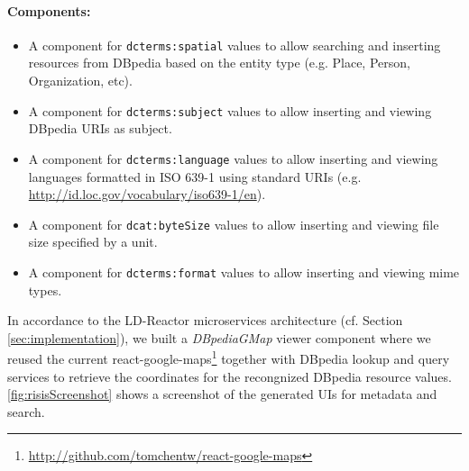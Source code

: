\documentclass{acm_proc_article-sp}
\begin{document}
\paragraph{Components:}
\begin{itemize}
 \item A component for \texttt{dcterms:spatial} values to allow searching and inserting resources from DBpedia based on the entity type (e.g. Place, Person, Organization, etc).
 \item A component for \texttt{dcterms:subject} values to allow inserting and viewing DBpedia URIs as subject.
 \item A component for \texttt{dcterms:language} values to allow inserting and viewing languages formatted in ISO 639-1 using standard URIs (e.g. \\ \url{http://id.loc.gov/vocabulary/iso639-1/en}).
 \item A component for \texttt{dcat:byteSize} values to allow inserting and viewing file size specified by a unit.
  \item A component for \texttt{dcterms:format} values to allow inserting and viewing mime types.
\end{itemize}

In accordance to the LD-Reactor microservices architecture (cf. Section \ref{sec:implementation}), we built a \emph{DBpediaGMap} viewer component where we reused the current react-google-maps\footnote{\url{http://github.com/tomchentw/react-google-maps}} together with DBpedia lookup and query services to retrieve the coordinates for the recongnized DBpedia resource values.\\
\autoref{fig:risisScreenshot} shows a screenshot of the generated UIs for metadata and search.
\end{document}
